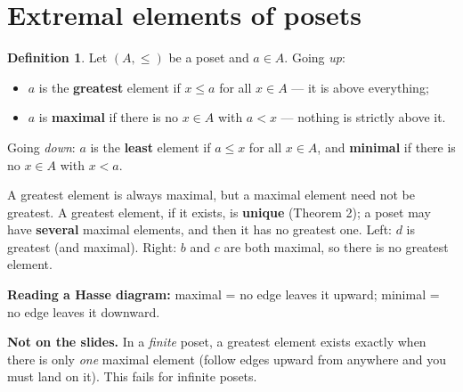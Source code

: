 \documentclass{fkt-notes}
\newcommand{\src}[1]{\par\noindent{\small\itshape Source: #1}\par\smallskip}
\newcommand{\kolman}[1]{\setcounter{section}{\numexpr#1-1\relax}}
\theoremstyle{definition}
\newtheorem*{defn}{Definition}
\begin{document}
\kolman{2}
\section{Extremal elements of posets}\src{Kolman 6.2}
%

\begin{defn}
  Let $(A,\le)$ be a poset and $a\in A$. Going \emph{up}:
  \begin{itemize}
    \item $a$ is the \textbf{greatest} element if $x\le a$ for all
          $x\in A$ --- it is above everything;
    \item $a$ is \textbf{maximal} if there is no $x\in A$ with $a<x$ ---
          nothing is strictly above it.
  \end{itemize}
  Going \emph{down}: $a$ is the \textbf{least} element if $a\le x$ for
  all $x\in A$, and \textbf{minimal} if there is no $x\in A$ with $x<a$.
\end{defn}

\begin{keybox}[title={Greatest vs.\ maximal}]
  \begin{minipage}{0.62\textwidth}
    A greatest element is always maximal, but a maximal element need not
    be greatest. A greatest element, if it exists, is \textbf{unique}
    (Theorem 2); a poset may have \textbf{several} maximal elements, and
    then it has no greatest one. Left: $d$ is greatest (and maximal).
    Right: $b$ and $c$ are both maximal, so there is no greatest element.

    \smallskip
    \textbf{Reading a Hasse diagram:} maximal = no edge leaves it upward;
    minimal = no edge leaves it downward.

    \smallskip
    \textbf{Not on the slides.} In a \emph{finite} poset, a greatest
    element exists exactly when there is only \emph{one} maximal element
    (follow edges upward from anywhere and you must land on it). This
    fails for infinite posets.
  \end{minipage}\hfill
  \begin{minipage}{0.34\textwidth}
    \centering
    \qquad
  \end{minipage}
\end{keybox}
\end{document}

